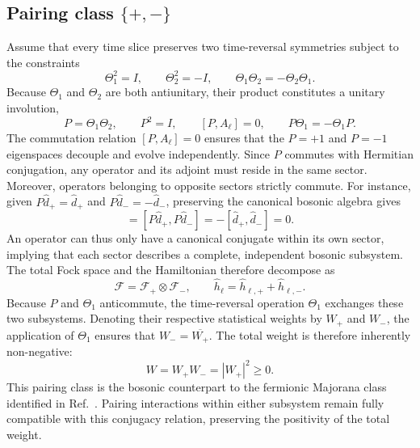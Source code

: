 \subsection{Pairing class \texorpdfstring{\(\{+,-\}\)}{\{+,-\}}}
\label{app:trs_pairing}

Assume that every time slice preserves two time-reversal symmetries subject to the constraints
\begin{equation}
    \Theta_1^2=I,\qquad \Theta_2^2=-I,\qquad
    \Theta_1\Theta_2=-\Theta_2\Theta_1.
\end{equation}
Because $\Theta_1$ and $\Theta_2$ are both antiunitary, their product constitutes a unitary involution,
\begin{equation}
    P=\Theta_1\Theta_2,\qquad P^2=I,\qquad
    [P,A_\ell]=0,\qquad P\Theta_1=-\Theta_1P.
\end{equation}
The commutation relation $[P,A_\ell]=0$ ensures that the $P=+1$ and $P=-1$ eigenspaces decouple and evolve independently. Since $P$ commutes with Hermitian conjugation, any operator and its adjoint must reside in the same sector. Moreover, operators belonging to opposite sectors strictly commute. For instance, given $P\hat d_+=\hat d_+$ and $P\hat d_-=-\hat d_-$, preserving the canonical bosonic algebra gives
\begin{equation}
    [\hat d_+,\hat d_-]=[P\hat d_+,P\hat d_-]
    =-[\hat d_+,\hat d_-]=0.
\end{equation}
An operator can thus only have a canonical conjugate within its own sector, implying that each sector describes a complete, independent bosonic subsystem. The total Fock space and the Hamiltonian therefore decompose as
\begin{equation}
    \mathcal F=\mathcal F_+\otimes\mathcal F_-,\qquad
    \hat h_\ell=\hat h_{\ell,+}+\hat h_{\ell,-}.
\end{equation}
Because $P$ and $\Theta_1$ anticommute, the time-reversal operation $\Theta_1$ exchanges these two subsystems. Denoting their respective statistical weights by $W_+$ and $W_-$, the application of $\Theta_1$ ensures that $W_-=\overline{W_+}$. The total weight is therefore inherently non-negative:
\begin{equation}
    W=W_+W_-=|W_+|^2\ge0.
    \label{eq:trs_pairing_weight}
\end{equation}
This pairing class is the bosonic counterpart to the fermionic Majorana class identified in Ref.~\cite{li2016prl}. Pairing interactions within either subsystem remain fully compatible with this conjugacy relation, preserving the positivity of the total weight.

